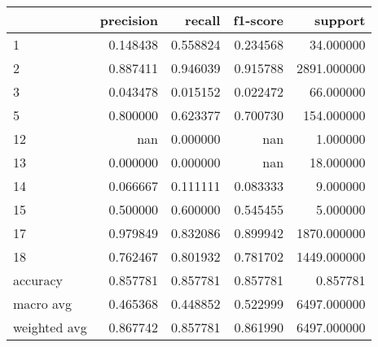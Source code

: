\begin{tabular}{lrrrr}
\toprule
 & precision & recall & f1-score & support \\
\midrule
1 & 0.148438 & 0.558824 & 0.234568 & 34.000000 \\
2 & 0.887411 & 0.946039 & 0.915788 & 2891.000000 \\
3 & 0.043478 & 0.015152 & 0.022472 & 66.000000 \\
5 & 0.800000 & 0.623377 & 0.700730 & 154.000000 \\
12 & nan & 0.000000 & nan & 1.000000 \\
13 & 0.000000 & 0.000000 & nan & 18.000000 \\
14 & 0.066667 & 0.111111 & 0.083333 & 9.000000 \\
15 & 0.500000 & 0.600000 & 0.545455 & 5.000000 \\
17 & 0.979849 & 0.832086 & 0.899942 & 1870.000000 \\
18 & 0.762467 & 0.801932 & 0.781702 & 1449.000000 \\
accuracy & 0.857781 & 0.857781 & 0.857781 & 0.857781 \\
macro avg & 0.465368 & 0.448852 & 0.522999 & 6497.000000 \\
weighted avg & 0.867742 & 0.857781 & 0.861990 & 6497.000000 \\
\bottomrule
\end{tabular}
